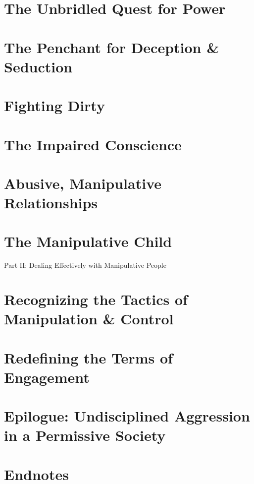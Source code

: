 \documentclass[oneside]{book}
\numberwithin{equation}{section}
\begin{document}
\section{The Unbridled Quest for Power}

\section{The Penchant for Deception \& Seduction}

\section{Fighting Dirty}

\section{The Impaired Conscience}

\section{Abusive, Manipulative Relationships}

\section{The Manipulative Child}

\begin{center}\huge
	Part II: Dealing Effectively with Manipulative People
\end{center}

\section{Recognizing the Tactics of Manipulation \& Control}

\section{Redefining the Terms of Engagement}

\section*{Epilogue: Undisciplined Aggression in a Permissive Society}

\section*{Endnotes}
\end{document}

